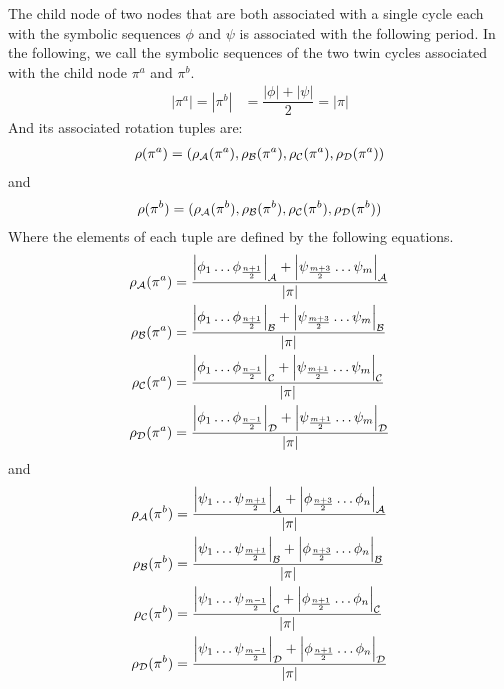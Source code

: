 \begin{theorem}
	The child node of two nodes that are both associated with a single cycle each with the symbolic sequences $\phi$ and $\psi$ is associated with the following period.
	In the following, we call the symbolic sequences of the two twin cycles associated with the child node $\pi^a$ and $\pi^b$.
	\begin{align}
		|\pi^a| = |\pi^b| & = \dfrac{|\phi| + |\psi|}{2} = |\pi|
	\end{align}
	And its associated rotation tuples are:
	\begin{align}
		\rho(\pi^a) = (\rho_{\mathcal{A}}(\pi^a), \rho_{\mathcal{B}}(\pi^a), \rho_{\mathcal{C}}(\pi^a), \rho_{\mathcal{D}}(\pi^a))
	\end{align}
	and
	\begin{align}
		\rho(\pi^b) = (\rho_{\mathcal{A}}(\pi^b), \rho_{\mathcal{B}}(\pi^b), \rho_{\mathcal{C}}(\pi^b), \rho_{\mathcal{D}}(\pi^b))
	\end{align}
	Where the elements of each tuple are defined by the following equations.
	\begin{subequations}
		\begin{align}
			\rho_{\mathcal{A}}(\pi^a) & = \dfrac{\left|\phi_1 \dots \phi_{\frac{n+1}{2}}\right|_{\mathcal{A}} + \left|\psi_{\frac{m+3}{2}} \dots \psi_m\right|_{\mathcal{A}}}{|\pi|} \\
			\rho_{\mathcal{B}}(\pi^a) & = \dfrac{\left|\phi_1 \dots \phi_{\frac{n+1}{2}}\right|_{\mathcal{B}} + \left|\psi_{\frac{m+3}{2}} \dots \psi_m\right|_{\mathcal{B}}}{|\pi|} \\
			\rho_{\mathcal{C}}(\pi^a) & = \dfrac{\left|\phi_1 \dots \phi_{\frac{n-1}{2}}\right|_{\mathcal{C}} + \left|\psi_{\frac{m+1}{2}} \dots \psi_m\right|_{\mathcal{C}}}{|\pi|} \\
			\rho_{\mathcal{D}}(\pi^a) & = \dfrac{\left|\phi_1 \dots \phi_{\frac{n-1}{2}}\right|_{\mathcal{D}} + \left|\psi_{\frac{m+1}{2}} \dots \psi_m\right|_{\mathcal{D}}}{|\pi|}
		\end{align}
	\end{subequations}
	and
	\begin{subequations}
		\begin{align}
			\rho_{\mathcal{A}}(\pi^b) & = \dfrac{\left|\psi_1 \dots \psi_{\frac{m+1}{2}}\right|_{\mathcal{A}} + \left|\phi_{\frac{n+3}{2}} \dots \phi_n\right|_{\mathcal{A}}}{|\pi|} \\
			\rho_{\mathcal{B}}(\pi^b) & = \dfrac{\left|\psi_1 \dots \psi_{\frac{m+1}{2}}\right|_{\mathcal{B}} + \left|\phi_{\frac{n+3}{2}} \dots \phi_n\right|_{\mathcal{B}}}{|\pi|} \\
			\rho_{\mathcal{C}}(\pi^b) & = \dfrac{\left|\psi_1 \dots \psi_{\frac{m-1}{2}}\right|_{\mathcal{C}} + \left|\phi_{\frac{n+1}{2}} \dots \phi_n\right|_{\mathcal{C}}}{|\pi|} \\
			\rho_{\mathcal{D}}(\pi^b) & = \dfrac{\left|\psi_1 \dots \psi_{\frac{m-1}{2}}\right|_{\mathcal{D}} + \left|\phi_{\frac{n+1}{2}} \dots \phi_n\right|_{\mathcal{D}}}{|\pi|}
		\end{align}
	\end{subequations}
\end{theorem}

